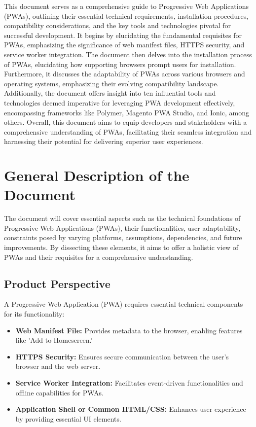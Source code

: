 \documentclass[12pt,a4paper, twosite]{article}
\begin{document}
This document serves as a comprehensive guide to Progressive Web Applications 
(PWAs), outlining their essential technical requirements, installation procedures, 
compatibility considerations, and the key tools and technologies pivotal for successful
development. It begins by elucidating the fundamental requisites for PWAs, emphasizing 
the significance of web manifest files, HTTPS security, and service worker integration. 
The document then delves into the installation process of PWAs, elucidating how supporting
browsers prompt users for installation. Furthermore, it discusses the adaptability of PWAs
across various browsers and operating systems, emphasizing their evolving compatibility 
landscape. Additionally, the document offers insight into ten influential tools and technologies
deemed imperative for leveraging PWA development effectively, encompassing frameworks like Polymer,
Magento PWA Studio, and Ionic, among others. Overall, this document aims to equip developers and 
stakeholders with a comprehensive understanding of PWAs, facilitating their seamless integration 
and harnessing their potential for delivering superior user experiences.

\newpage

\section{General Description of the Document}
\label{sec:orgc1c4017}

The document will cover essential aspects 
such as the technical foundations of Progressive 
Web Applications (PWAs), their functionalities, 
user adaptability, constraints posed by varying 
platforms, assumptions, dependencies, and future 
improvements. By dissecting these elements, it aims 
to offer a holistic view of PWAs and their requisites 
for a comprehensive understanding.


\subsection{Product Perspective}
\label{sec:org24980a8}

A Progressive Web Application (PWA) requires essential technical components for its functionality:
\begin{itemize}

\item  \textbf{Web Manifest File: }Provides metadata to the browser, enabling features like 'Add to Homescreen.'
\item \textbf{HTTPS Security: }Ensures secure communication between the user's browser and the web server.
\item \textbf{Service Worker Integration: }Facilitates event-driven functionalities and offline capabilities for PWAs.
\item \textbf{Application Shell or Common HTML/CSS: }Enhances user experience by providing essential UI elements.

\end{itemize}
\end{document}
